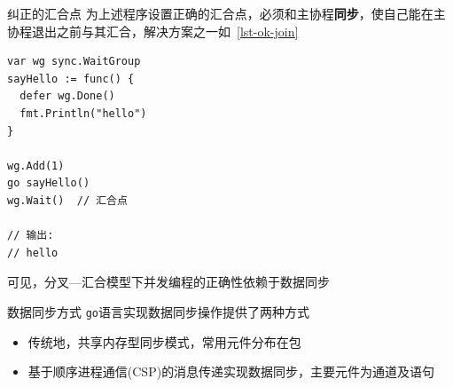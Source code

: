 \begin{frame}[fragile]{纠正的汇合点}
为上述程序设置正确的汇合点，必须和主协程\textbf{同步}，使自己能在主协程退出之前与其汇合，解决方案之一如\lstlistingname~\ref{lst-ok-join}

\begin{lstlisting}[caption={利用同步确保\code{sayHello}在主协程退出之前与其汇合},label=lst-ok-join]
var wg sync.WaitGroup
sayHello := func() {
  defer wg.Done()
  fmt.Println("hello")
}

wg.Add(1)
go sayHello()
wg.Wait()  // 汇合点

// 输出:
// hello    
\end{lstlisting}

\alert{可见，分叉---汇合模型下并发编程的正确性依赖于数据同步}
\end{frame}

\begin{frame}{数据同步方式}
\texttt{go}语言实现数据同步操作提供了两种方式
\begin{itemize}
    \item 传统地，\alert{共享内存型同步模式}，常用元件分布在包
    \item \alert{基于顺序进程通信(CSP)}的消息传递实现数据同步，主要元件为通道\channel 及\select 语句
\end{itemize}
\end{frame}